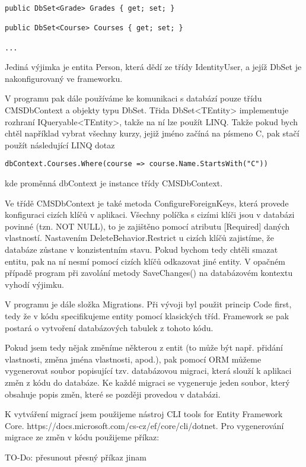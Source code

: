 \begin{lstlisting}
public DbSet<Grade> Grades { get; set; }

public DbSet<Course> Courses { get; set; }

...
\end{lstlisting}

Jediná výjimka je entita Person, která dědí ze třídy IdentityUser, a jejíž DbSet je nakonfigurovaný ve frameworku. 

V programu pak dále používáme ke komunikaci s databází pouze třídu CMSDbContext a objekty typu DbSet. Třida DbSet<TEntity> implementuje rozhraní IQueryable<TEntity>, takže na ní lze použít LINQ. Takže pokud bych chtěl například vybrat všechny kurzy, jejiž jméno začíná na písmeno C, pak stačí použít následující LINQ dotaz
\begin{lstlisting}
dbContext.Courses.Where(course => course.Name.StartsWith("C"))
\end{lstlisting}
kde proměnná dbContext je instance třídy CMSDbContext.

Ve třídě CMSDbContext je také metoda ConfigureForeignKeys, která provede konfiguraci cizích klíčů v aplikaci. Všechny políčka s cizími klíči jsou v databázi povinné (tzn. NOT NULL), to je zajištěno pomocí atributu [Required] daných vlastností. Nastavením DeleteBehavior.Restrict u cizích klíčů zajistíme, že databáze zůstane v konzistentním stavu. Pokud bychom tedy chtěli smazat entitu, pak na ní nesmí pomocí cizích klíčů odkazovat jiné entity. V opačném případě program při zavolání metody SaveChanges() na databázovém kontextu vyhodí výjimku.

V programu je dále složka Migrations. Při vývoji byl použit princip Code first, tedy že v kódu specifikujeme entity pomocí klasických tříd. Framework se pak postará o vytvoření databázových tabulek z tohoto kódu.

Pokud jsem tedy nějak změníme některou z entit (to může být např. přidání vlastnosti, změna jména vlastnosti, apod.), pak pomocí ORM můžeme vygenerovat soubor popisující tzv. databázovou migraci, která slouží k aplikaci změn z kódu do databáze. Ke každé migraci se vygeneruje jeden soubor, který obsahuje popis změn, které se později provedou v databázi.

K vytváření migrací jsem použijeme nástroj CLI tools for Entity Framework Core. https://docs.microsoft.com/cs-cz/ef/core/cli/dotnet. Pro vygenerování migrace ze změn v kódu použijeme příkaz:

TO-Do: přesunout přesný příkaz jinam

